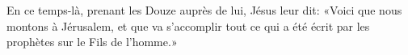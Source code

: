  En ce temps-là, prenant les Douze auprès de lui, Jésus leur dit:
	«Voici que nous montons à Jérusalem,
	et que va s’accomplir tout ce qui a été écrit par les prophètes
		sur le Fils de l’homme.»
